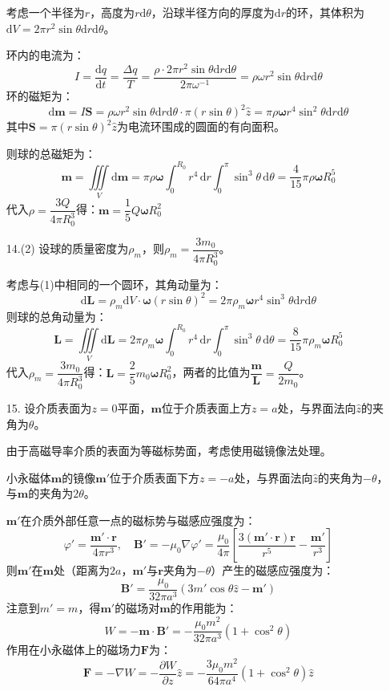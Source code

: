 \documentclass[a4paper,fontset=none]{ctexart}
\begin{document}
\begin{itemize}
    考虑一个半径为$r$，高度为$r\mathrm{d}\theta$，沿球半径方向的厚度为$\mathrm{d}r$的环，其体积为$\mathrm{d}V=2\pi r^2\sin\theta\mathrm{d}r\mathrm{d}\theta$。
    
    环内的电流为：
    \[
    I = \frac{\mathrm{d}q}{\mathrm{d}t} = \frac{\Delta q}{T} = \frac{\rho \cdot 2\pi r^2\sin\theta\mathrm{d}r\mathrm{d}\theta}{2\pi\omega^{-1}} = \rho\omega r^2\sin\theta\mathrm{d}r\mathrm{d}\theta
    \]
    环的磁矩为：
    \[
    \mathrm{d}\bm{m} = I\bm{S} = \rho\omega r^2\sin\theta\mathrm{d}r\mathrm{d}\theta \cdot \pi(r\sin\theta)^2\hat{z} = \pi\rho\bm{\omega}r^4\sin^2\theta\mathrm{d}r\mathrm{d}\theta
    \]
    其中$\bm{S}=\pi(r\sin\theta)^2\hat{z}$为电流环围成的圆面的有向面积。
    
    则球的总磁矩为：
    \[
    \bm{m} = \iiint\limits_V \mathrm{d}\bm{m} = \pi\rho\bm{\omega}\int_0^{R_0} r^4\,\mathrm{d}r \int_0^\pi \sin^3\theta\,\mathrm{d}\theta = \frac{4}{15}\pi\rho\bm{\omega}R_0^5
    \]
    代入$\rho=\dfrac{3Q}{4\pi R_0^3}$得：$\bm{m}=\dfrac{1}{5}Q\bm{\omega}R_0^2$

    \item[14.(2)]
    设球的质量密度为$\rho_m$，则$\rho_m=\dfrac{3m_0}{4\pi R_0^3}$。
    
    考虑与(1)中相同的一个圆环，其角动量为：
    \[
    \mathrm{d}\bm{L} = \rho_m\mathrm{d}V \cdot \bm{\omega}(r\sin\theta)^2 = 2\pi\rho_m\bm{\omega}r^4\sin^3\theta\mathrm{d}r\mathrm{d}\theta
    \]
    则球的总角动量为：
    \[
    \bm{L} = \iiint\limits_V \mathrm{d}\bm{L} = 2\pi\rho_m\bm{\omega}\int_0^{R_0} r^4\,\mathrm{d}r \int_0^\pi \sin^3\theta\,\mathrm{d}\theta = \frac{8}{15}\pi\rho_m\bm{\omega}R_0^5
    \]
    代入$\rho_m=\dfrac{3m_0}{4\pi R_0^3}$得：$\bm{L}=\dfrac{2}{5}m_0\bm{\omega}R_0^2$，两者的比值为$\dfrac{\bm{m}}{\bm{L}}=\dfrac{Q}{2m_0}$。

    \item[15.]
    设介质表面为$z=0$平面，$\bm{m}$位于介质表面上方$z=a$处，与界面法向$\hat{z}$的夹角为$\theta$。

    由于高磁导率介质的表面为等磁标势面，考虑使用磁镜像法处理。
    
    小永磁体$\bm{m}$的镜像$\bm{m}'$位于介质表面下方$z=-a$处，与界面法向$\hat{z}$的夹角为$-\theta$，与$\bm{m}$的夹角为$2\theta$。

    $\bm{m}'$在介质外部任意一点的磁标势与磁感应强度为：
    \[
        \varphi' = \frac{\bm{m}'\cdot\bm{r}}{4\pi r^3},\quad \bm{B}' = -\mu_0\nabla\varphi' = \frac{\mu_0}{4\pi}\left[\frac{3(\bm{m}'\cdot\bm{r})\bm{r}}{r^5}-\frac{\bm{m}'}{r^3}\right]
    \]
    则$\bm{m}'$在$\bm{m}$处（距离为$2a$，$\bm{m}'$与$\bm{r}$夹角为$-\theta$）产生的磁感应强度为：
    \[
        \bm{B}' = \frac{\mu_0}{32\pi a^3}(3m'\cos\theta\hat{z}-\bm{m}')
    \]
    注意到$m'=m$，得$\bm{m}'$的磁场对$\bm{m}$的作用能为：
    \[
        W = -\bm{m} \cdot \bm{B}' = -\frac{\mu_0 m^2}{32\pi a^3}\left(1+\cos^2\theta\right)
    \]
    作用在小永磁体上的磁场力$\bm{F}$为：
    \[
        \bm{F} = -\nabla W = -\frac{\partial W}{\partial z}\hat{z} = -\frac{3\mu_0 m^2}{64\pi a^4}\left(1+\cos^2\theta\right)\hat{z}
    \]

    \end{itemize}
\end{document}
